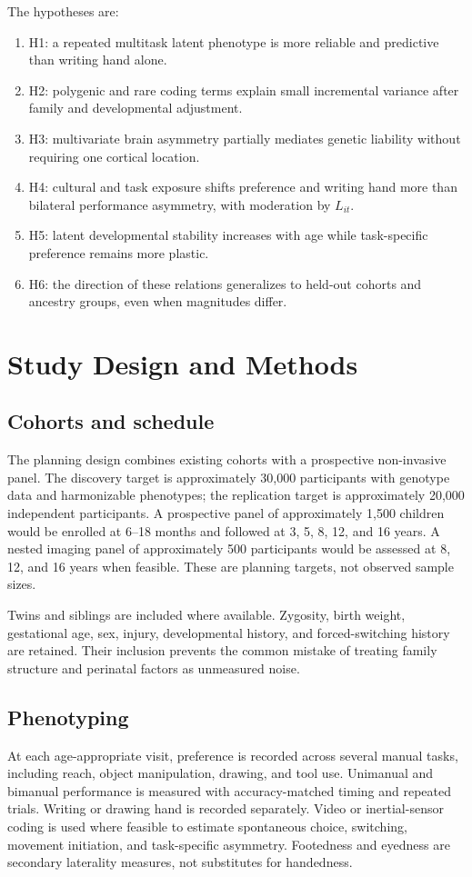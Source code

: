 \documentclass[10pt,conference]{IEEEtran}
\begin{document}
The hypotheses are:
\begin{enumerate}
\item H1: a repeated multitask latent phenotype is more reliable and predictive than writing hand alone.
\item H2: polygenic and rare coding terms explain small incremental variance after family and developmental adjustment.
\item H3: multivariate brain asymmetry partially mediates genetic liability without requiring one cortical location.
\item H4: cultural and task exposure shifts preference and writing hand more than bilateral performance asymmetry, with moderation by $L_{it}$.
\item H5: latent developmental stability increases with age while task-specific preference remains more plastic.
\item H6: the direction of these relations generalizes to held-out cohorts and ancestry groups, even when magnitudes differ.
\end{enumerate}

\section{Study Design and Methods}
\subsection{Cohorts and schedule}
The planning design combines existing cohorts with a prospective non-invasive panel. The discovery target is approximately 30,000 participants with genotype data and harmonizable phenotypes; the replication target is approximately 20,000 independent participants. A prospective panel of approximately 1,500 children would be enrolled at 6--18 months and followed at 3, 5, 8, 12, and 16 years. A nested imaging panel of approximately 500 participants would be assessed at 8, 12, and 16 years when feasible. These are planning targets, not observed sample sizes.

Twins and siblings are included where available. Zygosity, birth weight, gestational age, sex, injury, developmental history, and forced-switching history are retained. Their inclusion prevents the common mistake of treating family structure and perinatal factors as unmeasured noise.

\subsection{Phenotyping}
At each age-appropriate visit, preference is recorded across several manual tasks, including reach, object manipulation, drawing, and tool use. Unimanual and bimanual performance is measured with accuracy-matched timing and repeated trials. Writing or drawing hand is recorded separately. Video or inertial-sensor coding is used where feasible to estimate spontaneous choice, switching, movement initiation, and task-specific asymmetry. Footedness and eyedness are secondary laterality measures, not substitutes for handedness.
\end{document}
